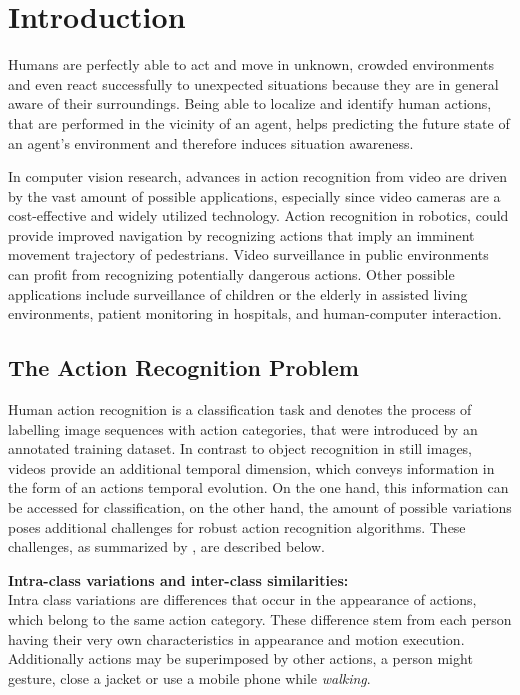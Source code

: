 \section{Introduction}


Humans are perfectly able to act and move in unknown, crowded environments and even react successfully to unexpected situations because they are in general aware of their surroundings.
Being able to localize and identify human actions, that are performed in the vicinity of an agent, helps predicting the future state of an agent's environment and therefore induces situation awareness.

In computer vision research, advances in action recognition from video are driven by the vast amount of possible applications, especially since video cameras are a cost-effective and widely utilized technology.
Action recognition in robotics, could provide improved navigation by recognizing actions that imply an imminent movement trajectory of pedestrians.
Video surveillance in public environments can profit from recognizing potentially dangerous actions.
Other possible applications include surveillance of children or the elderly in assisted living environments, patient monitoring in hospitals, and human-computer interaction.


\subsection{The Action Recognition Problem}
Human action recognition is a classification task and denotes the process of labelling image sequences with action categories, that were introduced by an annotated training dataset.
In contrast to object recognition in still images, videos provide an additional temporal dimension, which conveys information in the form of an actions temporal evolution.
On the one hand, this information can be accessed for classification, on the other hand, the amount of possible variations poses additional challenges for robust action recognition algorithms.
These challenges, as summarized by \textcite{poppe_survey_2010}, are described below.

\textbf{Intra-class variations and inter-class similarities:} \\
Intra class variations are differences that occur in the appearance of actions, which belong to the same action category.
These difference stem from each person having their very own characteristics in appearance and motion execution.
Additionally actions may be superimposed by other actions, a person might gesture, close a jacket or use a mobile phone while \textit{walking}.

